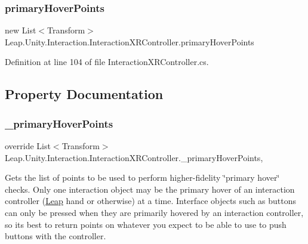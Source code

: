 \mbox{\label{class_leap_1_1_unity_1_1_interaction_1_1_interaction_x_r_controller_a1b5abc7602f840695df4eae23ead0e37}} 
\subsubsection{\texorpdfstring{primaryHoverPoints}{primaryHoverPoints}}
{\footnotesize\ttfamily new List$<$Transform$>$ Leap.\+Unity.\+Interaction.\+Interaction\+X\+R\+Controller.\+primary\+Hover\+Points}



Definition at line 104 of file Interaction\+X\+R\+Controller.\+cs.



\subsection{Property Documentation}
\mbox{\label{class_leap_1_1_unity_1_1_interaction_1_1_interaction_x_r_controller_a79aa1c89e60ed3e606957e9c0d92a2b9}} 
\subsubsection{\texorpdfstring{\_primaryHoverPoints}{\_primaryHoverPoints}}
{\footnotesize\ttfamily override List$<$Transform$>$ Leap.\+Unity.\+Interaction.\+Interaction\+X\+R\+Controller.\+\_\+primary\+Hover\+Points\hspace{0.3cm}{\ttfamily [get]}, {\ttfamily [protected]}}



Gets the list of points to be used to perform higher-\/fidelity \char`\"{}primary hover\char`\"{} checks. Only one interaction object may be the primary hover of an interaction controller (\mbox{\hyperlink{namespace_leap_1_1_unity_1_1_leap}{Leap}} hand or otherwise) at a time. Interface objects such as buttons can only be pressed when they are primarily hovered by an interaction controller, so it\textquotesingle{}s best to return points on whatever you expect to be able to use to push buttons with the controller. 



